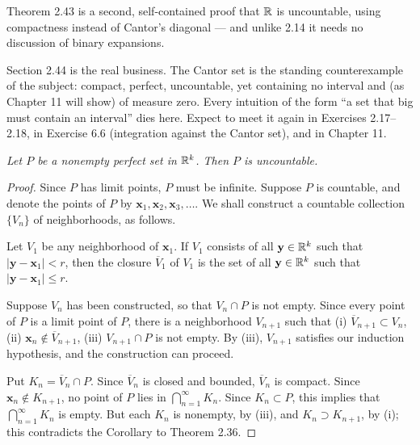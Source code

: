 
\begin{signpost}
Theorem 2.43 is a second, self-contained proof that $\mathbb{R}$ is uncountable, using
compactness instead of Cantor's diagonal --- and unlike 2.14 it needs no
discussion of binary expansions.

\smallskip
Section 2.44 is the real business. The Cantor set is the standing
counterexample of the subject: compact, perfect, uncountable, yet containing no
interval and (as Chapter 11 will show) of measure zero. Every intuition of the
form ``a set that big must contain an interval'' dies here. Expect to meet it
again in Exercises 2.17--2.18, in Exercise 6.6 (integration against the Cantor
set), and in Chapter 11.
\end{signpost}

\emph{Let $P$ be a nonempty perfect set in $\mathbb{R}^k$. Then $P$ is uncountable.}

\begin{proof}
Since $P$ has limit points, $P$ must be infinite. Suppose $P$ is countable, and
denote the points of $P$ by $\mathbf{x}_1,\mathbf{x}_2,\mathbf{x}_3,\dots$. We
shall construct a countable collection $\{V_n\}$ of neighborhoods, as
follows.

Let $V_1$ be any neighborhood of $\mathbf{x}_1$. If $V_1$ consists of all
$\mathbf{y} \in \mathbb{R}^k$ such that $|\mathbf{y}-\mathbf{x}_1| < r$, then the
closure $\overline{V}_1$ of $V_1$ is the set of all $\mathbf{y} \in \mathbb{R}^k$ such
that $|\mathbf{y}-\mathbf{x}_1| \le r$.

Suppose $V_n$ has been constructed, so that $V_n \cap P$ is not empty. Since
every point of $P$ is a limit point of $P$, there is a neighborhood $V_{n+1}$
such that (i) $\overline{V}_{n+1} \subset V_n$, (ii)
$\mathbf{x}_n \notin \overline{V}_{n+1}$, (iii) $V_{n+1} \cap P$ is not
empty. By (iii), $V_{n+1}$ satisfies our
induction hypothesis, and the construction can proceed.

Put $K_n = \overline{V}_n \cap P$. Since $\overline{V}_n$ is closed and
bounded, $\overline{V}_n$ is compact. Since $\mathbf{x}_n \notin K_{n+1}$, no
point of $P$ lies in $\bigcap_{n=1}^\infty K_n$. Since $K_n \subset P$, this
implies that $\bigcap_{n=1}^\infty K_n$ is empty. But each $K_n$ is nonempty,
by (iii), and $K_n \supset K_{n+1}$, by (i); this contradicts the Corollary to
Theorem 2.36.
\end{proof}

